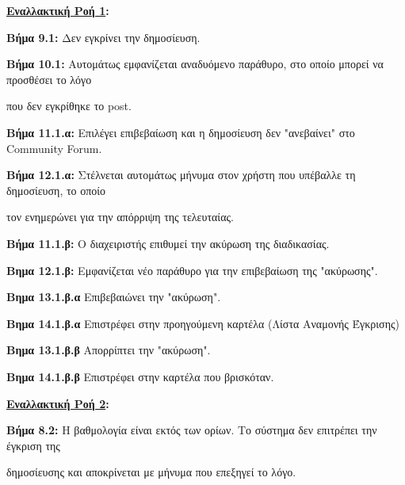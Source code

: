 \documentclass{article}
\begin{document}
 \textbf{\underline{Εναλλακτική Ροή 1}:} \vspace{0.2cm}
\par \textbf{Βήμα 9.1:} Δεν εγκρίνει την δημοσίευση. \vspace{0.1cm}
\par \textbf{Βήμα 10.1:} Αυτομάτως εμφανίζεται αναδυόμενο παράθυρο, στο οποίο μπορεί να προσθέσει το λόγο \par που δεν εγκρίθηκε το post. \vspace{0.2cm}

\par \textbf{Βήμα 11.1.α:} Επιλέγει επιβεβαίωση και η δημοσίευση δεν "ανεβαίνει" στο Community Forum. \vspace{0.1cm}
\par \textbf{Βήμα 12.1.α:}  Στέλνεται αυτομάτως μήνυμα στον χρήστη που υπέβαλλε τη δημοσίευση, το οποίο \par τον ενημερώνει για την απόρριψη της τελευταίας. \vspace{0.2cm}

\par \textbf{Βήμα 11.1.β:}  Ο διαχειριστής επιθυμεί την ακύρωση της διαδικασίας.

\vspace{0.2cm}

\par \textbf{Βημα 12.1.β:} Εμφανίζεται νέο παράθυρο για την επιβεβαίωση της "ακύρωσης". \vspace{0.1cm}
\par \textbf{Βημα 13.1.β.α} Επιβεβαιώνει την "ακύρωση". \vspace{0.1cm}
\par \textbf{Βημα 14.1.β.α} Επιστρέφει στην προηγούμενη καρτέλα (Λίστα Αναμονής Έγκρισης) \vspace{0.2cm}

\par \textbf{Βημα 13.1.β.β}  Απορρίπτει την "ακύρωση". \vspace{0.1cm}
\par \textbf{Βημα 14.1.β.β} Επιστρέφει στην καρτέλα που βρισκόταν. \vspace{0.2cm}

\textbf{\underline{Εναλλακτική Ροή 2}:} \vspace{0.2cm}
\par \textbf{Βήμα 8.2:} Η βαθμολογία είναι εκτός των ορίων. Το σύστημα δεν επιτρέπει την έγκριση της \par δημοσίευσης και αποκρίνεται με μήνυμα που επεξηγεί το λόγο. \vspace{0.2cm}
\end{document}
